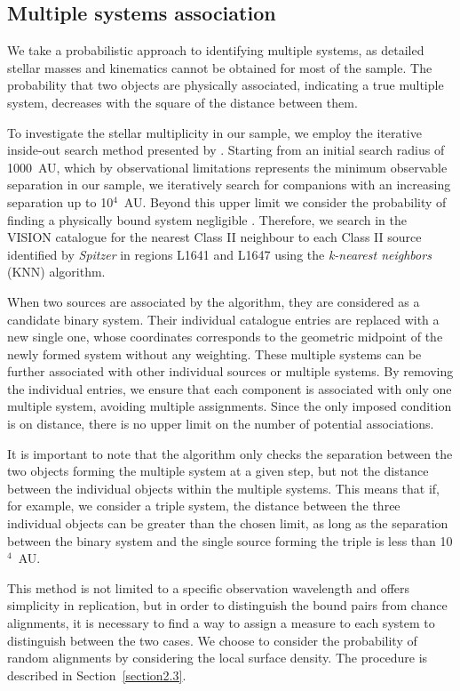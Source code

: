 \documentclass{aa}
\begin{document}
\subsection{Multiple systems association}

We take a probabilistic approach to identifying multiple systems, as detailed stellar masses and kinematics cannot be obtained for most of the sample. The probability that two objects are physically associated, indicating a true multiple system, decreases with the square of the distance between them. \par
To investigate the stellar multiplicity in our sample, we employ the iterative inside-out search method presented by \cite{Tobin_2022}. Starting from an initial search radius of 1000~AU, which by observational limitations represents the minimum observable separation in our sample, we iteratively search for companions with an increasing separation up to 10$^4$~AU. Beyond this upper limit we consider the probability of finding a physically bound system negligible \citep{Tobin_2022}. Therefore, we search in the VISION catalogue \citep{VisionCatalogue19} for the nearest Class II neighbour to each Class II source identified by \textit{Spitzer} in regions L1641 and L1647 using the \textit{k-nearest neighbors} (KNN) algorithm. \par
When two sources are associated by the algorithm, they are considered as a candidate binary system. Their individual catalogue entries are replaced with a new single one, whose coordinates corresponds to the geometric midpoint of the newly formed system without any weighting. These multiple systems can be further associated with other individual sources or multiple systems. By removing the individual entries, we ensure that each component is associated with only one multiple system, avoiding multiple assignments. Since the only imposed condition is on distance, there is no upper limit on the number of potential associations. \par
It is important to note that the algorithm only checks the separation between the two objects forming the multiple system at a given step, but not the distance between the individual objects within the multiple systems. This means that if, for example, we consider a triple system, the distance between the three individual objects can be greater than the chosen limit, as long as the separation between the binary system and the single source forming the triple is less than 10$^4$~AU. \par
This method is not limited to a specific observation wavelength and offers simplicity in replication, but in order to distinguish the bound pairs from chance alignments, it is necessary to find a way to assign a measure to each system to distinguish between the two cases. We choose to consider the probability of random alignments by considering the local surface density. The procedure is described in Section~\ref{section2.3}.
\end{document}
